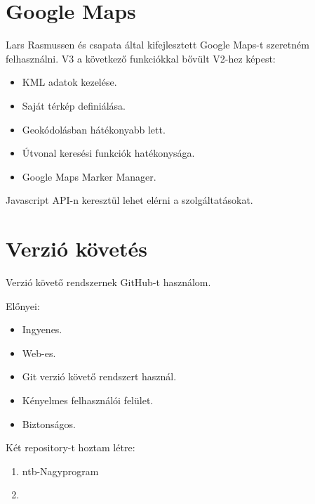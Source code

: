 	\section{Google Maps}
	Lars Rasmussen és csapata által kifejlesztett Google Maps-t szeretném felhasználni. V3 a következő funkciókkal bővült V2-hez képest:
	\begin{itemize}
		\item KML adatok kezelése.
		\item Saját térkép definiálása.
		\item Geokódolásban hátékonyabb lett.
		\item Útvonal keresési funkciók hatékonysága.
		\item Google Maps Marker Manager.
	\end{itemize}
	Javascript API-n keresztül lehet elérni a szolgáltatásokat.
	
	\section{Verzió követés}
	Verzió követő rendszernek GitHub-t használom.
	
	Előnyei:
	\begin{itemize}
		\item Ingyenes.
		\item Web-es.
		\item Git verzió követő rendszert használ.
		\item Kényelmes felhasználói felület.
		\item Biztonságos.
	\end{itemize}
	
	Két repository-t hoztam létre:
	\begin{enumerate}
		\item ntb-Nagyprogram
		\item 
	\end{enumerate}
